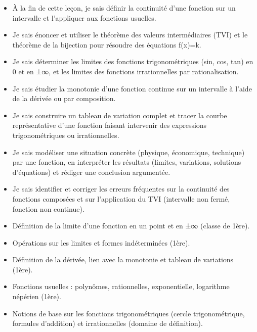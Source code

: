 \documentclass[11pt]{article}
\begin{document}
\begin{objectifs}
\begin{itemize}
\item À la fin de cette leçon, je sais définir la continuité d'une fonction sur un intervalle et l'appliquer aux fonctions usuelles.
\item Je sais énoncer et utiliser le théorème des valeurs intermédiaires (TVI) et le théorème de la bijection pour résoudre des équations f(x)=k.
\item Je sais déterminer les limites des fonctions trigonométriques (sin, cos, tan) en 0 et en ±∞, et les limites des fonctions irrationnelles par rationalisation.
\item Je sais étudier la monotonie d'une fonction continue sur un intervalle à l'aide de la dérivée ou par composition.
\item Je sais construire un tableau de variation complet et tracer la courbe représentative d'une fonction faisant intervenir des expressions trigonométriques ou irrationnelles.
\item Je sais modéliser une situation concrète (physique, économique, technique) par une fonction, en interpréter les résultats (limites, variations, solutions d'équations) et rédiger une conclusion argumentée.
\item Je sais identifier et corriger les erreurs fréquentes sur la continuité des fonctions composées et sur l'application du TVI (intervalle non fermé, fonction non continue).
\end{itemize}
\end{objectifs}

\begin{prerequis}
\begin{itemize}
\item Définition de la limite d'une fonction en un point et en ±∞ (classe de 1ère).
\item Opérations sur les limites et formes indéterminées (1ère).
\item Définition de la dérivée, lien avec la monotonie et tableau de variations (1ère).
\item Fonctions usuelles : polynômes, rationnelles, exponentielle, logarithme népérien (1ère).
\item Notions de base sur les fonctions trigonométriques (cercle trigonométrique, formules d'addition) et irrationnelles (domaine de définition).
\end{itemize}
\end{prerequis}
\end{document}
